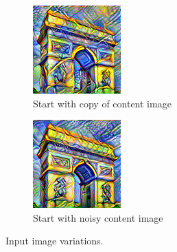 \documentclass[twocolumn,superscriptaddress,aps, floatfix]{revtex4-1}
\begin{document}
    \begin{figure}[ht]
        \centering
        \begin{subfigure}[b]{0.22\textwidth}
            \centering
            \includegraphics[width=\textwidth]{resources/png/inputs/sun-trees-paris-copy.png}
            \caption{Start with copy of content image}
        \end{subfigure}
        \hfill
        \begin{subfigure}[b]{0.22\textwidth}
            \centering
            \includegraphics[width=\textwidth]{resources/png/inputs/sun-trees-paris-noisy.png}
            \caption{Start with noisy content image}
        \end{subfigure}
        \caption{Input image variations.}
        \label{fig:input.image.variations}
    \end{figure}
    
\end{document}
